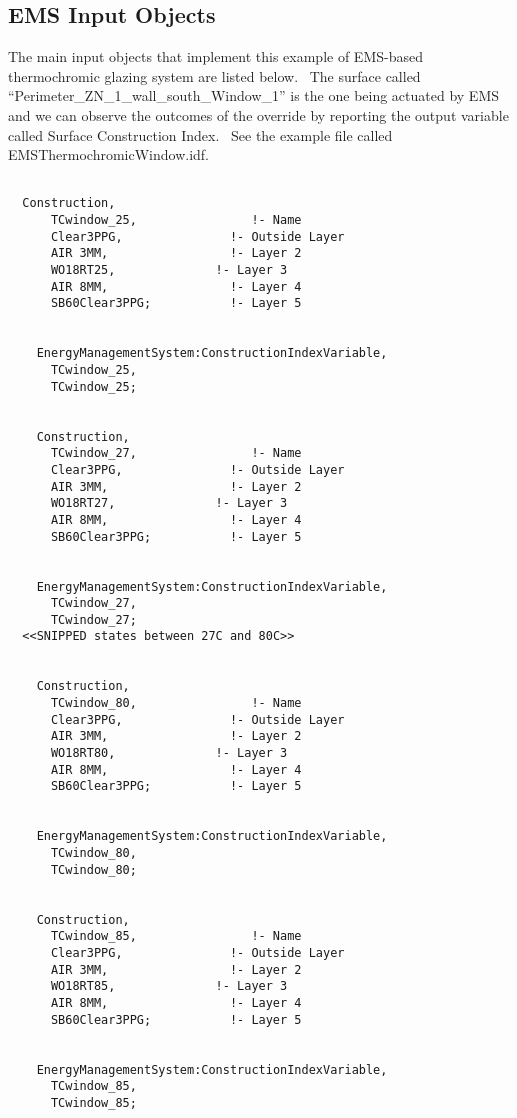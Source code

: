 \subsection{EMS Input Objects}\label{ems-input-objects-003}

The main input objects that implement this example of EMS-based thermochromic glazing system are listed below.~ The surface called ``Perimeter\_ZN\_1\_wall\_south\_Window\_1'' is the one being actuated by EMS and we can observe the outcomes of the override by reporting the output variable called Surface Construction Index.~ See the example file called EMSThermochromicWindow.idf.

\begin{lstlisting}

  Construction,
      TCwindow_25,                !- Name
      Clear3PPG,               !- Outside Layer
      AIR 3MM,                 !- Layer 2
      WO18RT25,              !- Layer 3
      AIR 8MM,                 !- Layer 4
      SB60Clear3PPG;           !- Layer 5


    EnergyManagementSystem:ConstructionIndexVariable,
      TCwindow_25,
      TCwindow_25;


    Construction,
      TCwindow_27,                !- Name
      Clear3PPG,               !- Outside Layer
      AIR 3MM,                 !- Layer 2
      WO18RT27,              !- Layer 3
      AIR 8MM,                 !- Layer 4
      SB60Clear3PPG;           !- Layer 5


    EnergyManagementSystem:ConstructionIndexVariable,
      TCwindow_27,
      TCwindow_27;
  <<SNIPPED states between 27C and 80C>>


    Construction,
      TCwindow_80,                !- Name
      Clear3PPG,               !- Outside Layer
      AIR 3MM,                 !- Layer 2
      WO18RT80,              !- Layer 3
      AIR 8MM,                 !- Layer 4
      SB60Clear3PPG;           !- Layer 5


    EnergyManagementSystem:ConstructionIndexVariable,
      TCwindow_80,
      TCwindow_80;


    Construction,
      TCwindow_85,                !- Name
      Clear3PPG,               !- Outside Layer
      AIR 3MM,                 !- Layer 2
      WO18RT85,              !- Layer 3
      AIR 8MM,                 !- Layer 4
      SB60Clear3PPG;           !- Layer 5


    EnergyManagementSystem:ConstructionIndexVariable,
      TCwindow_85,
      TCwindow_85;



\end{lstlisting}
